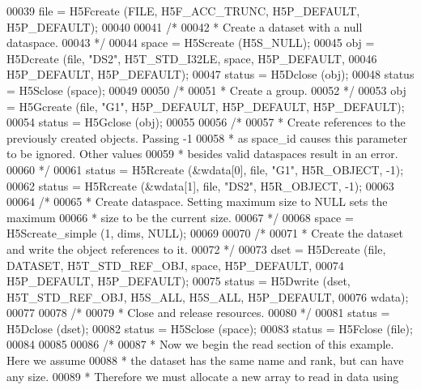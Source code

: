 \begin{DoxyCode}
00039     file = H5Fcreate (FILE, H5F\_ACC\_TRUNC, H5P\_DEFAULT, H5P\_DEFAULT);
00040 
00041     \textcolor{comment}{/*}
00042 \textcolor{comment}{     * Create a dataset with a null dataspace.}
00043 \textcolor{comment}{     */}
00044     space = H5Screate (H5S\_NULL);
00045     obj = H5Dcreate (file, \textcolor{stringliteral}{"DS2"}, H5T\_STD\_I32LE, space, H5P\_DEFAULT,
00046                 H5P\_DEFAULT, H5P\_DEFAULT);
00047     status = H5Dclose (obj);
00048     status = H5Sclose (space);
00049 
00050     \textcolor{comment}{/*}
00051 \textcolor{comment}{     * Create a group.}
00052 \textcolor{comment}{     */}
00053     obj = H5Gcreate (file, \textcolor{stringliteral}{"G1"}, H5P\_DEFAULT, H5P\_DEFAULT, H5P\_DEFAULT);
00054     status = H5Gclose (obj);
00055 
00056     \textcolor{comment}{/*}
00057 \textcolor{comment}{     * Create references to the previously created objects.  Passing -1}
00058 \textcolor{comment}{     * as space\_id causes this parameter to be ignored.  Other values}
00059 \textcolor{comment}{     * besides valid dataspaces result in an error.}
00060 \textcolor{comment}{     */}
00061     status = H5Rcreate (&wdata[0], file, \textcolor{stringliteral}{"G1"}, H5R\_OBJECT, -1);
00062     status = H5Rcreate (&wdata[1], file, \textcolor{stringliteral}{"DS2"}, H5R\_OBJECT, -1);
00063 
00064     \textcolor{comment}{/*}
00065 \textcolor{comment}{     * Create dataspace.  Setting maximum size to NULL sets the maximum}
00066 \textcolor{comment}{     * size to be the current size.}
00067 \textcolor{comment}{     */}
00068     space = H5Screate\_simple (1, dims, NULL);
00069 
00070     \textcolor{comment}{/*}
00071 \textcolor{comment}{     * Create the dataset and write the object references to it.}
00072 \textcolor{comment}{     */}
00073     dset = H5Dcreate (file, DATASET, H5T\_STD\_REF\_OBJ, space, H5P\_DEFAULT,
00074                 H5P\_DEFAULT, H5P\_DEFAULT);
00075     status = H5Dwrite (dset, H5T\_STD\_REF\_OBJ, H5S\_ALL, H5S\_ALL, H5P\_DEFAULT,
00076                 wdata);
00077 
00078     \textcolor{comment}{/*}
00079 \textcolor{comment}{     * Close and release resources.}
00080 \textcolor{comment}{     */}
00081     status = H5Dclose (dset);
00082     status = H5Sclose (space);
00083     status = H5Fclose (file);
00084 
00085 
00086     \textcolor{comment}{/*}
00087 \textcolor{comment}{     * Now we begin the read section of this example.  Here we assume}
00088 \textcolor{comment}{     * the dataset has the same name and rank, but can have any size.}
00089 \textcolor{comment}{     * Therefore we must allocate a new array to read in data using}

\end{DoxyCode}
